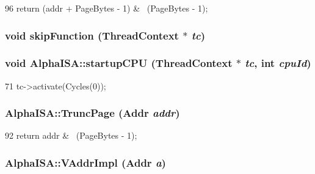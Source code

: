 \begin{DoxyCode}
96 { return (addr + PageBytes - 1) & ~(PageBytes - 1); }
\end{DoxyCode}
\hypertarget{namespaceAlphaISA_a2624d7d8bac3eb03de2eb6e83903c208}{
\subsubsection[{skipFunction}]{\setlength{\rightskip}{0pt plus 5cm}void skipFunction ({\bf ThreadContext} $\ast$ {\em tc})}}
\label{namespaceAlphaISA_a2624d7d8bac3eb03de2eb6e83903c208}
\hypertarget{namespaceAlphaISA_a65b7ec798c399b980dc23332b8684a0b}{
\subsubsection[{startupCPU}]{\setlength{\rightskip}{0pt plus 5cm}void AlphaISA::startupCPU ({\bf ThreadContext} $\ast$ {\em tc}, \/  int {\em cpuId})}}
\label{namespaceAlphaISA_a65b7ec798c399b980dc23332b8684a0b}



\begin{DoxyCode}
71 { tc->activate(Cycles(0)); }
\end{DoxyCode}
\hypertarget{namespaceAlphaISA_aa30de8739aa107005b5f69984513fc8f}{
\subsubsection[{TruncPage}]{ AlphaISA::TruncPage ({\bf Addr} {\em addr})}}
\label{namespaceAlphaISA_aa30de8739aa107005b5f69984513fc8f}



\begin{DoxyCode}
92 { return addr & ~(PageBytes - 1); }
\end{DoxyCode}
\hypertarget{namespaceAlphaISA_a06a35d8f74d0d30584c5962c5b15e4bd}{
\subsubsection[{VAddrImpl}]{ AlphaISA::VAddrImpl ({\bf Addr} {\em a})}}
\label{namespaceAlphaISA_a06a35d8f74d0d30584c5962c5b15e4bd}



